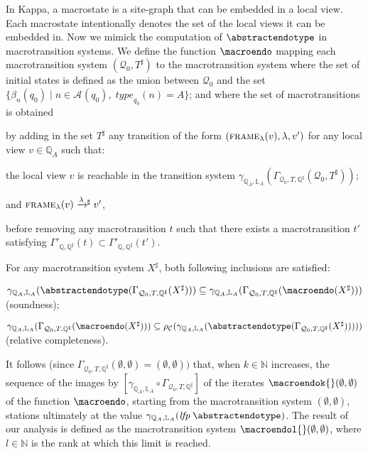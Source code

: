 \documentclass[10pt,a4paper]{llncs}
\newcommand{\agents}[1][]{\mathcal{A}_{#1}}
\newcommand{\type}[1][]{\textit{type}_{#1}}
\newcommand{\states}{\mathbb{Q}}
\newcommand{\localstates}[1][A]{\states_{#1}}
\newcommand{\labels}{\mathbb{L}}
\newcommand{\locallabels}[1][A]{\labels_{#1}}
\newcommand{\transitionsystemwoparentheses}{\mathcal{Q}_0,T}
\newcommand{\gammatransitionsystem}[1][\states,\labels]{\gamma_{#1}}
\newcommand{\lfp}[1]{\textit{lfp}\;#1}
\newcommand{\gammamacrotransitions}{\Gamma'_{\states,\states^{\sharp}}}
\newcommand{\gammamacrotransitionsystem}{\Gamma_{\transitionsystemwoparentheses,\states^{\sharp}}}
\renewcommand{\frame}[2][\lambda]{\textsc{frame}_{#1}(#2)}
\begin{document}
In Kappa, a macrostate is a site-graph that can be embedded in a local view. Each macrostate intentionally denotes the set of the local views it can be embedded in. Now we mimick the computation of $\abstractendotype$ in macrotransition systems.
We define the function $\macroendo$ mapping each  macrotransition system $(\mathcal{Q}_0,T^{\sharp})$ to the macrotransition system where the set of initial states is defined as the union between $\mathcal{Q}_0$ and the set
$\{\beta_n(q_0)\;|\;n\in\agents(q_0),\; \type[q_0](n)=A\}$;  and where the set of macrotransitions is obtained  \begin{inparaenum}\item by adding in the set $T^{\sharp}$ any transition of the form $(\frame{v},\lambda,v')$ for any local view $v\in\localstates$ such that:
\begin{inparaenum} \item the local view $v$ is reachable in the transition system $\gammatransitionsystem[\localstates,\locallabels](\gammamacrotransitionsystem(\mathcal{Q}_0,T^{\sharp}))$; \item and $\frame{v}\xrightarrow{\lambda}{\!\!}^{\sharp}\; v'$, \end{inparaenum}\item before removing any macrotransition $t$ such that there exists a macrotransition $t'$ satisfying  $\gammamacrotransitions(t)\subset \gammamacrotransitions(t')$.
\end{inparaenum}

\newcommand{\border}{\abstractendotype(\gammamacrotransitionsystem(X^{\sharp}))}
\newcommand{\middleterm}{\gammamacrotransitionsystem (\macroendo(X^{\sharp}))}

For any macrotransition system $X^{\sharp}$, both following inclusions are satisfied:\\
\begin{inparaenum}\item  $\gammatransitionsystem[\localstates,\locallabels](\border)\subseteq\gammatransitionsystem[\localstates,\locallabels](\middleterm)$ (soundness); \item
$\gammatransitionsystem[\localstates,\locallabels](\middleterm)\subseteq
\rho_{\mathcal{C}}(\gammatransitionsystem[\localstates,\locallabels](\border)))$ (relative completeness). \end{inparaenum}
It follows (since $\gammamacrotransitionsystem(\emptyset,\emptyset)=(\emptyset,\emptyset))$ that, when $k\in\mathbb{N}$ increases, the sequence of the images by $[\gammatransitionsystem[\localstates,\locallabels]\circ \gammamacrotransitionsystem]$ of the iterates  $\macroendok{}(\emptyset,\emptyset)$ of the function $\macroendo$, starting from the %
macrotransition system $(\emptyset,\emptyset)$, stations ultimately at the value   $\gammatransitionsystem[\localstates,\locallabels](\lfp \abstractendotype)$.
The result of our analysis is  defined as the macrotransition system
$\macroendol{}(\emptyset,\emptyset)$, where $l\in\mathbb{N}$ is the rank at which this limit is reached.
\end{document}
